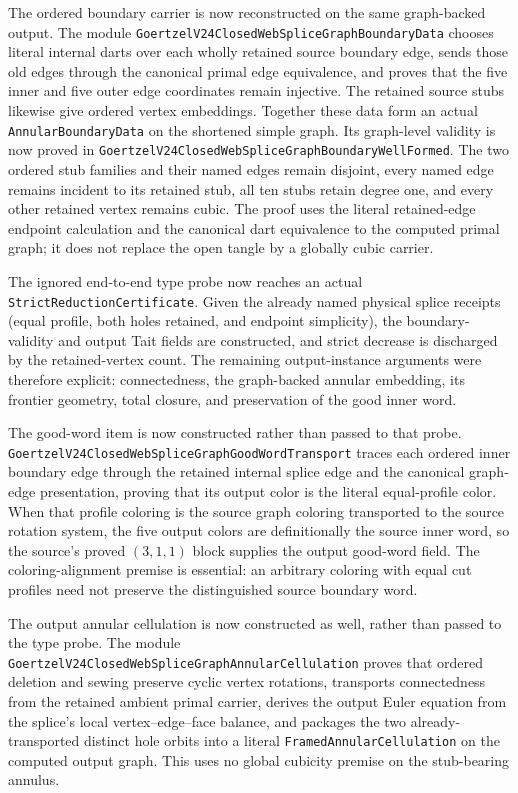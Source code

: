 \documentclass[11pt]{article}
\theoremstyle{definition}
\begin{document}
The ordered boundary carrier is now reconstructed on the same graph-backed
output.  The module
\texttt{GoertzelV24ClosedWebSpliceGraphBoundaryData} chooses literal internal
darts over each wholly retained source boundary edge, sends those old edges
through the canonical primal edge equivalence, and proves that the five inner
and five outer edge coordinates remain injective.  The retained source stubs
likewise give ordered vertex embeddings.  Together these data form an actual
\texttt{AnnularBoundaryData} on the shortened simple graph.  Its graph-level
validity is now proved in
\texttt{GoertzelV24ClosedWebSpliceGraphBoundaryWellFormed}.  The two ordered
stub families and their named edges remain disjoint, every named edge remains
incident to its retained stub, all ten stubs retain degree one, and every
other retained vertex remains cubic.  The proof uses the literal retained-edge
endpoint calculation and the canonical dart equivalence to the computed primal
graph; it does not replace the open tangle by a globally cubic carrier.

The ignored end-to-end type probe now reaches an actual
\texttt{StrictReductionCertificate}.  Given the already named physical splice
receipts (equal profile, both holes retained, and endpoint simplicity), the
boundary-validity and output Tait fields are constructed, and strict decrease
is discharged by the retained-vertex count.  The remaining output-instance
arguments were therefore explicit: connectedness, the graph-backed annular
embedding, its frontier geometry, total closure, and preservation of the good
inner word.

The good-word item is now constructed rather than passed to that probe.
\texttt{GoertzelV24ClosedWebSpliceGraphGoodWordTransport} traces each ordered
inner boundary edge through the retained internal splice edge and the
canonical graph-edge presentation, proving that its output color is the
literal equal-profile color.  When that profile coloring is the source graph
coloring transported to the source rotation system, the five output colors
are definitionally the source inner word, so the source's proved
\((3,1,1)\) block supplies the output good-word field.  The coloring-alignment
premise is essential: an arbitrary coloring with equal cut profiles need not
preserve the distinguished source boundary word.

The output annular cellulation is now constructed as well, rather than passed
to the type probe.  The module
\texttt{GoertzelV24ClosedWebSpliceGraphAnnularCellulation} proves that ordered
deletion and sewing preserve cyclic vertex rotations, transports connectedness
from the retained ambient primal carrier, derives the output Euler equation
from the splice's local vertex--edge--face balance, and packages the two
already-transported distinct hole orbits into a literal
\texttt{FramedAnnularCellulation} on the computed output graph.  This uses no
global cubicity premise on the stub-bearing annulus.
\end{document}
